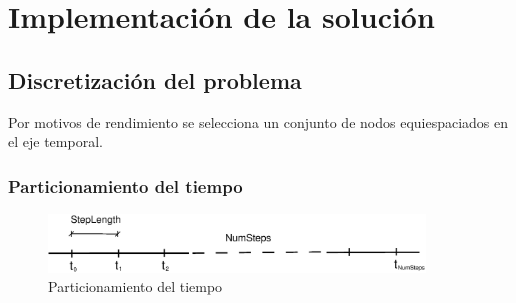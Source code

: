 
%
%
%
%
%
%
%
%

\chapter{Implementaci\'on de la soluci\'on}
\label{sec:implementation}

\section{Discretizaci\'on del problema}

Por motivos de rendimiento se selecciona un conjunto de nodos equiespaciados
en el eje temporal.

\subsection{Particionamiento del tiempo}

\begin{figure}[!hb]
\begin{center}
\includegraphics[width=10cm,angle=0]{./images/time.eps}
\caption{Particionamiento del tiempo}
\label{timetranches}
\end{center}
\end{figure}

